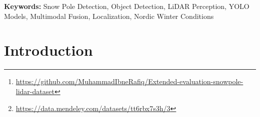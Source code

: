 \documentclass[runningheads]{llncs}
\begin{document}
\begin{abstract}
***

## Step 3: Modality Branch Ablation (Experiment 3)

- Train/test variants:
  - RGB only (original YOLO).
  - A channel only (range or infrared).
  - Combined RGB + A channels (fused or dual-branch).
- Keep everything else constant.
- Evaluate how much the additional modality boosts detection performance.

***

## Step 4: Fusion Architecture Ablation (Experiment 5)

- Swap fusion types to compare:
  - Simple concatenation of RGBA input.
  - Element-wise addition post feature extraction of separate branches.
  - Gated fusion where learnable weights modulate feature contributions.
- Ensure consistent training schedules.
- Measure trade-offs in precision, recall, mAP, and inference latency.

***

## Step 5: Merkle Tree or Tile-based Inference Caching (Experiment 7)

- Implement caching of unchanged spatial regions between frames/inputs using:
  - Tile-based difference checks.
  - Merkle or hash tree computation on input partitions.
- Skip inference for cached tiles and merge predictions for full frame.
- Benchmarks inference speed gains and any minor impacts on detection metrics.



All datasets, code, and trained models are publicly available to support reproducibility via our GitHub repository\footnote{\url{https://github.com/MuhammadIbneRafiq/Extended-evaluation-snowpole-lidar-dataset}} and the Mendeley dataset archive\footnote{\url{https://data.mendeley.com/datasets/tt6rbx7s3h/3}}.
\end{abstract}







\textbf{Keywords:} Snow Pole Detection, Object Detection, LiDAR Perception, YOLO Models, Multimodal Fusion, Localization, Nordic Winter Conditions




\section{Introduction}
\end{document}
